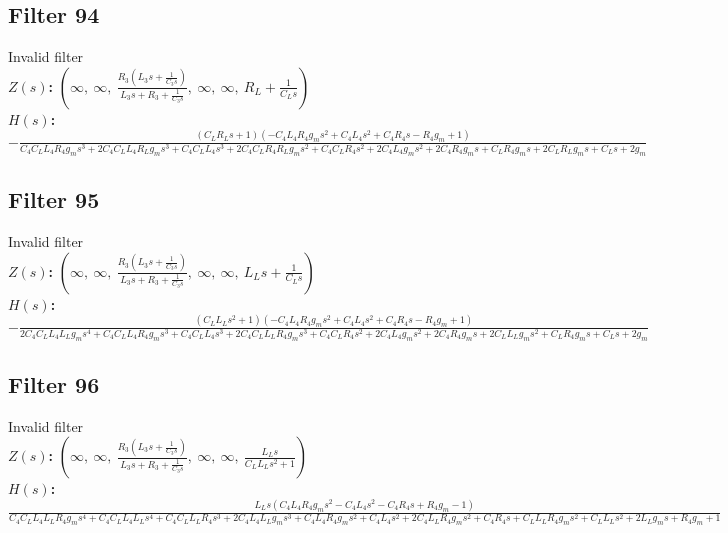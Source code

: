 \documentclass{article}
\begin{document}
\subsection*{Filter 94}
Invalid filter \\ 
\textbf{$Z(s)$:} $\left( \infty, \  \infty, \  \frac{R_{3} \left(L_{3} s + \frac{1}{C_{3} s}\right)}{L_{3} s + R_{3} + \frac{1}{C_{3} s}}, \  \infty, \  \infty, \  R_{L} + \frac{1}{C_{L} s}\right)$ \\ 
\textbf{$H(s)$:} $- \frac{\left(C_{L} R_{L} s + 1\right) \left(- C_{4} L_{4} R_{4} g_{m} s^{2} + C_{4} L_{4} s^{2} + C_{4} R_{4} s - R_{4} g_{m} + 1\right)}{C_{4} C_{L} L_{4} R_{4} g_{m} s^{3} + 2 C_{4} C_{L} L_{4} R_{L} g_{m} s^{3} + C_{4} C_{L} L_{4} s^{3} + 2 C_{4} C_{L} R_{4} R_{L} g_{m} s^{2} + C_{4} C_{L} R_{4} s^{2} + 2 C_{4} L_{4} g_{m} s^{2} + 2 C_{4} R_{4} g_{m} s + C_{L} R_{4} g_{m} s + 2 C_{L} R_{L} g_{m} s + C_{L} s + 2 g_{m}}$ \\ 
\subsection*{Filter 95}
Invalid filter \\ 
\textbf{$Z(s)$:} $\left( \infty, \  \infty, \  \frac{R_{3} \left(L_{3} s + \frac{1}{C_{3} s}\right)}{L_{3} s + R_{3} + \frac{1}{C_{3} s}}, \  \infty, \  \infty, \  L_{L} s + \frac{1}{C_{L} s}\right)$ \\ 
\textbf{$H(s)$:} $- \frac{\left(C_{L} L_{L} s^{2} + 1\right) \left(- C_{4} L_{4} R_{4} g_{m} s^{2} + C_{4} L_{4} s^{2} + C_{4} R_{4} s - R_{4} g_{m} + 1\right)}{2 C_{4} C_{L} L_{4} L_{L} g_{m} s^{4} + C_{4} C_{L} L_{4} R_{4} g_{m} s^{3} + C_{4} C_{L} L_{4} s^{3} + 2 C_{4} C_{L} L_{L} R_{4} g_{m} s^{3} + C_{4} C_{L} R_{4} s^{2} + 2 C_{4} L_{4} g_{m} s^{2} + 2 C_{4} R_{4} g_{m} s + 2 C_{L} L_{L} g_{m} s^{2} + C_{L} R_{4} g_{m} s + C_{L} s + 2 g_{m}}$ \\ 
\subsection*{Filter 96}
Invalid filter \\ 
\textbf{$Z(s)$:} $\left( \infty, \  \infty, \  \frac{R_{3} \left(L_{3} s + \frac{1}{C_{3} s}\right)}{L_{3} s + R_{3} + \frac{1}{C_{3} s}}, \  \infty, \  \infty, \  \frac{L_{L} s}{C_{L} L_{L} s^{2} + 1}\right)$ \\ 
\textbf{$H(s)$:} $\frac{L_{L} s \left(C_{4} L_{4} R_{4} g_{m} s^{2} - C_{4} L_{4} s^{2} - C_{4} R_{4} s + R_{4} g_{m} - 1\right)}{C_{4} C_{L} L_{4} L_{L} R_{4} g_{m} s^{4} + C_{4} C_{L} L_{4} L_{L} s^{4} + C_{4} C_{L} L_{L} R_{4} s^{3} + 2 C_{4} L_{4} L_{L} g_{m} s^{3} + C_{4} L_{4} R_{4} g_{m} s^{2} + C_{4} L_{4} s^{2} + 2 C_{4} L_{L} R_{4} g_{m} s^{2} + C_{4} R_{4} s + C_{L} L_{L} R_{4} g_{m} s^{2} + C_{L} L_{L} s^{2} + 2 L_{L} g_{m} s + R_{4} g_{m} + 1}$ \\ 
\end{document}
